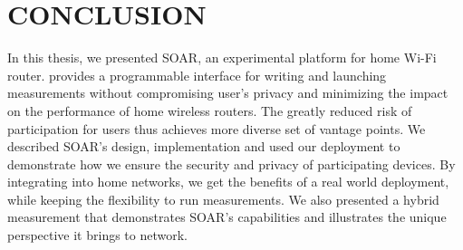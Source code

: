 \chapter{CONCLUSION}
\label{sec.conclusion}
In this thesis, we presented SOAR, an experimental platform for home Wi-Fi router. \sysname provides a programmable interface for writing and launching measurements without compromising user's privacy and minimizing the impact on the performance of home wireless routers. The greatly reduced risk of participation for users thus achieves more diverse set of vantage points. We described SOAR's design, implementation and used our deployment to demonstrate how we ensure the security and privacy of participating devices. By integrating \sysname into home networks, we get the benefits of a real world deployment, while keeping the flexibility to run measurements. We also presented a hybrid measurement that demonstrates SOAR's capabilities and illustrates the unique perspective it brings to network. 